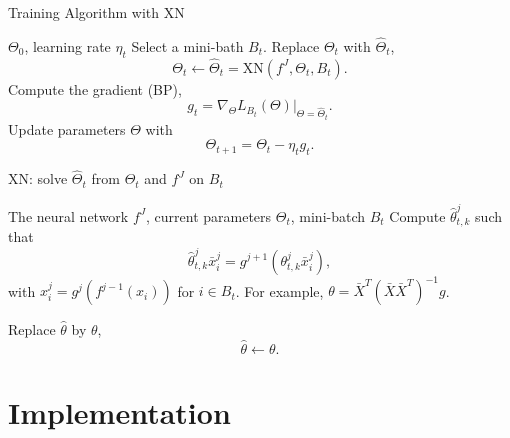 \begin{algorithm}[htb]
	\caption{Training Algorithm with XN}
	\label{alg0_XN}
	\begin{algorithmic}[1]
		\Require $\Theta_0$, learning rate $\eta_t$
		\State Select a mini-bath $B_t$.
		\State Replace $\Theta_t$ with $\hat{\Theta}_t$,
		\begin{equation}
			\Theta_t\leftarrow \hat{\Theta}_t = \text{XN}(f^J, \Theta_t, B_t).
		\end{equation}
		\State Compute the gradient (BP),
		\begin{equation}
			g_t = \nabla_{\Theta} L_{B_t}(\Theta) |_{\Theta = \hat{\Theta}_t}.
		\end{equation}
		\State Update parameters $\Theta$ with
		\begin{equation}
			\Theta_{t+1} = \Theta_{t} - \eta_t g_t.
		\end{equation}
		\EndFor
	\end{algorithmic}
\end{algorithm}

\begin{algorithm}[htb]
\caption{XN: solve $\hat \Theta_t$ from $\Theta_t$ and $f^J$ on $B_t$}
\label{XN_solve}
\begin{algorithmic}[1]
\Require The neural network $f^J$,  current parameters $\Theta_t$, mini-batch $B_t$
\State Compute $\hat \theta^j_{t,k}$ such that
\begin{equation}\label{eq1:XN}
\hat{\theta}_{t,k}^j \bar{x}^j_i = g^{j+1}({\theta}_{t,k}^j \bar{x}^j_i),
\end{equation}
with $x^j_i = g^j(f^{j-1}(x_i))$ for $i \in B_t$. For example, $\theta=\bar{X}^T(\bar X\bar X^T)^{-1}g$.

\State Replace $\hat\theta$ by $\theta$,
\begin{equation}
	\hat\theta\leftarrow\theta.
\end{equation}
\EndFor
\EndFor
\end{algorithmic}
\end{algorithm}

\section{Implementation}

